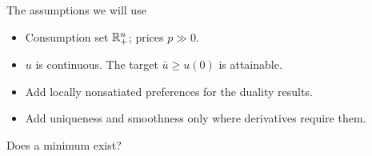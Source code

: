 \documentclass[handout,aspectratio=169,10pt]{beamer}
\begin{document}
\begin{frame}[label=assumptions]{The assumptions we will use}

\begin{itemize}\setlength{\itemsep}{.85em}
\item<1-> Consumption set $\mathbb{R}_+^n$; prices $p\gg0$.
\item<2-> $u$ is continuous. The target $\bar u\ge u(0)$ is attainable.
\item<3-> Add locally nonsatiated preferences for the duality results.
\item<4-> Add uniqueness and smoothness only where derivatives require them.
\end{itemize}
\end{frame}

\begin{frame}[label=existence]{Does a minimum exist?}

\par
{}\par
{}
\par
\end{frame}
\end{document}

